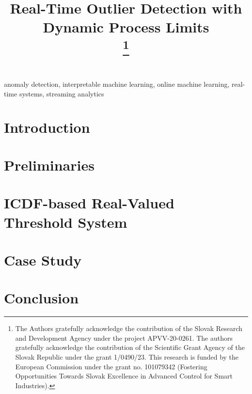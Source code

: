 \documentclass[conference]{IEEEtran}
\begin{document}
\title{Real-Time Outlier Detection with Dynamic Process Limits\\

\thanks{The Authors gratefully acknowledge the contribution of the Slovak Research and Development Agency under the project APVV-20-0261. The authors gratefully acknowledge the contribution of the Scientific Grant Agency of the Slovak Republic under the grant 1/0490/23. This research is funded by the European Commission under the grant no. 101079342 (Fostering Opportunities Towards Slovak Excellence in Advanced Control for Smart Industries).}
}

\author{
\and
{}
}

\maketitle

\begin{abstract}

\end{abstract}

\begin{IEEEkeywords}
anomaly detection, interpretable machine learning, online machine learning, real-time systems, streaming analytics
\end{IEEEkeywords}

\section{Introduction}\label{Introduction}


\section{Preliminaries}


\section{ICDF-based Real-Valued Threshold System}


\section{Case Study}


\section{Conclusion}




\end{document}
